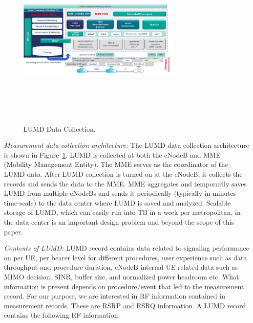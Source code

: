 \documentclass[conference, 10pt]{IEEEtran}
\begin{document}
\begin{figure}[t]
\begin{center}
\includegraphics[height=3.5in,width=3.2in]{./ONAP-architecture.png}
\caption{\label{fig:lumd_arch}
{\small LUMD Data Collection.}}
\end{center}
\end{figure}



{\em Measurement data collection architecture:} The LUMD data collection architecture
is shown in Figure~\ref{fig:lumd_arch}. LUMD is collected at both the eNodeB and MME
(Mobility Management Entity). The MME serves as the coordinator of the LUMD data.
After LUMD collection is turned on at the eNodeB, it collects the records and sends
the data to the MME. MME aggregates and temporarily saves LUMD from multiple
eNodeBs and sends it periodically (typically in minutes time-scale) to the data
center where LUMD is saved and analyzed. Scalable storage of LUMD, which can easily
run into TB in a week per metropolitan, in the data center is an important design
problem and beyond the scope of this paper.


{\em Contents of LUMD:} LUMD record contains data related to signaling performance on
per UE, per bearer level for different procedures, user experience such as data
throughput and procedure duration, eNodeB internal UE related data such as MIMO
decision, SINR, buffer size, and normalized power headroom etc.  What information is
present depends on procedure/event that led to the measurement record. For our
purpose, we are interested in RF information contained in measurement records. These
are RSRP and RSRQ information. A LUMD record contains the following RF information:
\end{document}
